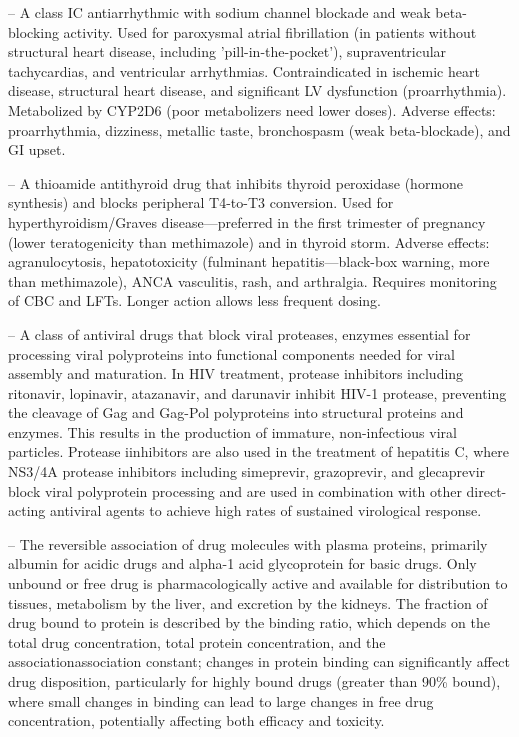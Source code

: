 -- A class IC antiarrhythmic with sodium channel blockade and weak beta-blocking activity. Used for paroxysmal atrial fibrillation (in patients without structural heart disease, including 'pill-in-the-pocket'), supraventricular tachycardias, and ventricular arrhythmias. Contraindicated in ischemic heart disease, structural heart disease, and significant LV dysfunction (proarrhythmia). Metabolized by CYP2D6 (poor metabolizers need lower doses). Adverse effects: proarrhythmia, dizziness, metallic taste, bronchospasm (weak beta-blockade), and GI upset.

-- A thioamide antithyroid drug that inhibits thyroid peroxidase (hormone synthesis) and blocks peripheral T4-to-T3 conversion. Used for hyperthyroidism/Graves disease—preferred in the first trimester of pregnancy (lower teratogenicity than methimazole) and in thyroid storm. Adverse effects: agranulocytosis, hepatotoxicity (fulminant hepatitis—black-box warning, more than methimazole), ANCA vasculitis, rash, and arthralgia. Requires monitoring of CBC and LFTs. Longer action allows less frequent dosing.

-- A class of antiviral drugs that block viral proteases, enzymes essential for processing viral polyproteins into functional components needed for viral assembly and maturation. In HIV treatment, protease inhibitors including ritonavir, lopinavir, atazanavir, and darunavir inhibit HIV-1 protease, preventing the cleavage of Gag and Gag-Pol polyproteins into structural proteins and enzymes. This results in the production of immature, non-infectious viral particles. Protease iinhibitors are also used in the treatment of hepatitis C, where NS3/4A protease inhibitors including simeprevir, grazoprevir, and glecaprevir block viral polyprotein processing and are used in combination with other direct-acting antiviral agents to achieve high rates of sustained virological response.

-- The reversible association of drug molecules with plasma proteins, primarily albumin for acidic drugs and alpha-1 acid glycoprotein for basic drugs. Only unbound or free drug is pharmacologically active and available for distribution to tissues, metabolism by the liver, and excretion by the kidneys. The fraction of drug bound to protein is described by the binding ratio, which depends on the total drug concentration, total protein concentration, and the associationassociation constant; changes in protein binding can significantly affect drug disposition, particularly for highly bound drugs (greater than 90\% bound), where small changes in binding can lead to large changes in free drug concentration, potentially affecting both efficacy and toxicity.

